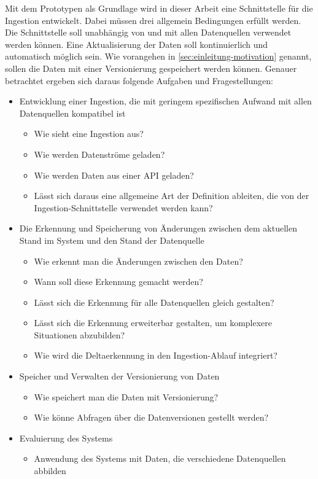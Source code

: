 Mit dem Prototypen als Grundlage wird in dieser Arbeit eine Schnittstelle für die Ingestion entwickelt.
Dabei müssen drei allgemein Bedingungen erfüllt werden.
Die Schnittstelle soll unabhängig von und mit allen Datenquellen verwendet werden können.
Eine Aktualisierung der Daten soll kontinuierlich und automatisch möglich sein.
Wie vorangehen in \cref{sec:einleitung-motivation} genannt, sollen die Daten mit einer Versionierung gespeichert werden können.
Genauer betrachtet ergeben sich daraus folgende Aufgaben und Fragestellungen: \begin{itemize}
    \item Entwicklung einer Ingestion, die mit geringem spezifischen Aufwand mit allen Datenquellen kompatibel ist \begin{itemize}
        \item Wie sieht eine Ingestion aus?
        \item Wie werden Datenströme geladen?
        \item Wie werden Daten aus einer API geladen?
        \item Lässt sich daraus eine allgemeine Art der Definition ableiten, die von der Ingestion-Schnittstelle verwendet werden kann?
    \end{itemize}
    \item Die Erkennung und Speicherung von Änderungen zwischen dem aktuellen Stand im System und den Stand der Datenquelle \begin{itemize}
        \item Wie erkennt man  die Änderungen zwischen den Daten?
        \item Wann soll diese Erkennung gemacht werden?
        \item Lässt sich die Erkennung für alle Datenquellen gleich gestalten?
        \item Lässt sich die Erkennung erweiterbar gestalten, um komplexere Situationen abzubilden?
        \item Wie wird die Deltaerkennung in den Ingestion-Ablauf integriert?
    \end{itemize}
    \item Speicher und Verwalten der Versionierung von Daten \begin{itemize}
        \item Wie speichert man die Daten mit Versionierung?
        \item Wie könne Abfragen über die Datenversionen gestellt werden?
    \end{itemize}
    \item Evaluierung des Systems \begin{itemize}
        \item Anwendung des Systems mit Daten, die verschiedene Datenquellen abbilden
    \end{itemize}
\end{itemize}


